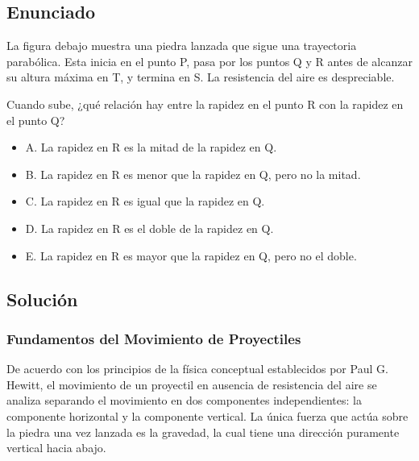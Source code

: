 \documentclass[12pt, a4paper]{article}
\begin{document}
\subsection*{Enunciado}

La figura debajo muestra una piedra lanzada que sigue una trayectoria parabólica. Esta inicia en el punto P, pasa por los puntos Q y R antes de alcanzar su altura máxima en T, y termina en S. La resistencia del aire es despreciable.

\vspace{0.5cm}
\begin{center}
\end{center}
\vspace{0.5cm}

Cuando sube, ¿qué relación hay entre la rapidez en el punto R con la rapidez en el punto Q?

\begin{itemize}
    \item A. La rapidez en R es la mitad de la rapidez en Q.
    \item B. La rapidez en R es menor que la rapidez en Q, pero no la mitad.
    \item C. La rapidez en R es igual que la rapidez en Q.
    \item D. La rapidez en R es el doble de la rapidez en Q.
    \item E. La rapidez en R es mayor que la rapidez en Q, pero no el doble.
\end{itemize}

\subsection*{Solución}

\subsubsection*{Fundamentos del Movimiento de Proyectiles}

De acuerdo con los principios de la física conceptual establecidos por Paul G. Hewitt, el movimiento de un proyectil en ausencia de resistencia del aire se analiza separando el movimiento en dos componentes independientes: la componente horizontal y la componente vertical. La única fuerza que actúa sobre la piedra una vez lanzada es la gravedad, la cual tiene una dirección puramente vertical hacia abajo. 
\end{document}
